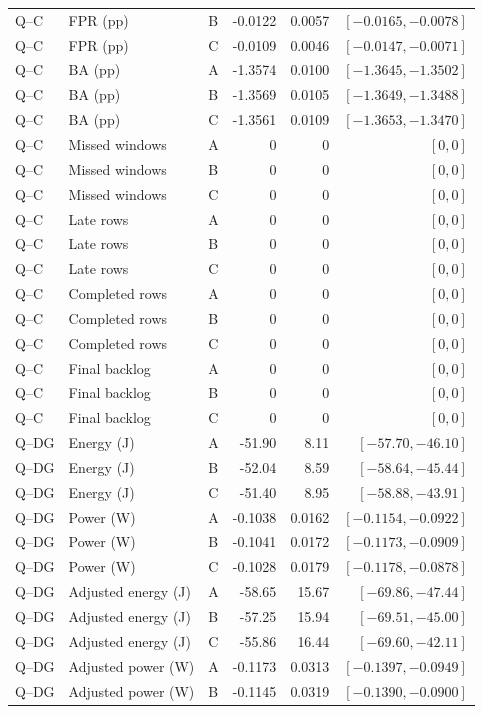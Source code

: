 \begin{longtable}{lllrrr}
Q--C & FPR (pp) & B & -0.0122 & 0.0057 & $[-0.0165,-0.0078]$\\
Q--C & FPR (pp) & C & -0.0109 & 0.0046 & $[-0.0147,-0.0071]$\\
Q--C & BA (pp) & A & -1.3574 & 0.0100 & $[-1.3645,-1.3502]$\\
Q--C & BA (pp) & B & -1.3569 & 0.0105 & $[-1.3649,-1.3488]$\\
Q--C & BA (pp) & C & -1.3561 & 0.0109 & $[-1.3653,-1.3470]$\\
Q--C & Missed windows & A & 0 & 0 & $[0,0]$\\
Q--C & Missed windows & B & 0 & 0 & $[0,0]$\\
Q--C & Missed windows & C & 0 & 0 & $[0,0]$\\
Q--C & Late rows & A & 0 & 0 & $[0,0]$\\
Q--C & Late rows & B & 0 & 0 & $[0,0]$\\
Q--C & Late rows & C & 0 & 0 & $[0,0]$\\
Q--C & Completed rows & A & 0 & 0 & $[0,0]$\\
Q--C & Completed rows & B & 0 & 0 & $[0,0]$\\
Q--C & Completed rows & C & 0 & 0 & $[0,0]$\\
Q--C & Final backlog & A & 0 & 0 & $[0,0]$\\
Q--C & Final backlog & B & 0 & 0 & $[0,0]$\\
Q--C & Final backlog & C & 0 & 0 & $[0,0]$\\
Q--DG & Energy (J) & A & -51.90 & 8.11 & $[-57.70,-46.10]$\\
Q--DG & Energy (J) & B & -52.04 & 8.59 & $[-58.64,-45.44]$\\
Q--DG & Energy (J) & C & -51.40 & 8.95 & $[-58.88,-43.91]$\\
Q--DG & Power (W) & A & -0.1038 & 0.0162 & $[-0.1154,-0.0922]$\\
Q--DG & Power (W) & B & -0.1041 & 0.0172 & $[-0.1173,-0.0909]$\\
Q--DG & Power (W) & C & -0.1028 & 0.0179 & $[-0.1178,-0.0878]$\\
Q--DG & Adjusted energy (J) & A & -58.65 & 15.67 & $[-69.86,-47.44]$\\
Q--DG & Adjusted energy (J) & B & -57.25 & 15.94 & $[-69.51,-45.00]$\\
Q--DG & Adjusted energy (J) & C & -55.86 & 16.44 & $[-69.60,-42.11]$\\
Q--DG & Adjusted power (W) & A & -0.1173 & 0.0313 & $[-0.1397,-0.0949]$\\
Q--DG & Adjusted power (W) & B & -0.1145 & 0.0319 & $[-0.1390,-0.0900]$\\

\end{longtable}
